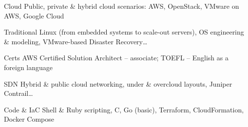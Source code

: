 
\begin{cvskills}

  \cvskill
    {Cloud} %
    {Public, private \& hybrid cloud scenarios: AWS, OpenStack, VMware on AWS, Google Cloud}

  \cvskill
    {Traditional} %
    {Linux (from embedded systems to scale-out servers), OS engineering \& modeling, VMware-based Disaster Recovery\dots}

  \cvskill
    {Certs} %
    {AWS Certified Solution Architect -- associate; TOEFL -- English as a foreign language}

  \cvskill
    {SDN} %
    {Hybrid \& public cloud networking, under \& overcloud layouts, Juniper Contrail\dots}

  \cvskill
    {Code \& IaC} %
    {Shell \& Ruby scripting, C, Go (basic), Terraform, CloudFormation, Docker Compose}

\end{cvskills}
